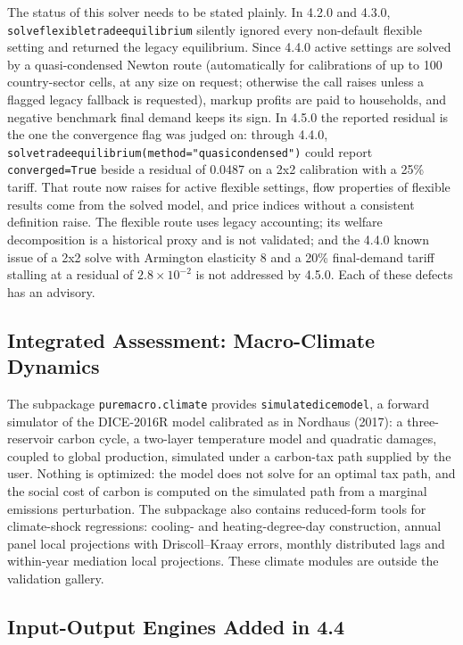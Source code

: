 \documentclass[11pt,letterpaper]{article}
\renewcommand{\_}{\pmunderscore\allowbreak}
\begin{document}
The status of this solver needs to be stated plainly. In 4.2.0 and 4.3.0, \texttt{solve\_flexible\_trade\_equilibrium} silently ignored every non-default flexible setting and returned the legacy equilibrium. Since 4.4.0 active settings are solved by a quasi-condensed Newton route (automatically for calibrations of up to 100 country-sector cells, at any size on request; otherwise the call raises unless a flagged legacy fallback is requested), markup profits are paid to households, and negative benchmark final demand keeps its sign. In 4.5.0 the reported residual is the one the convergence flag was judged on: through 4.4.0, \texttt{solve\_trade\_equilibrium(method="quasi\_condensed")} could report \texttt{converged=True} beside a residual of 0.0487 on a 2x2 calibration with a 25\% tariff. That route now raises for active flexible settings, flow properties of flexible results come from the solved model, and price indices without a consistent definition raise. The flexible route uses legacy accounting; its welfare decomposition is a historical proxy and is not validated; and the 4.4.0 known issue of a 2x2 solve with Armington elasticity 8 and a 20\% final-demand tariff stalling at a residual of \(2.8\times10^{-2}\) is not addressed by 4.5.0. Each of these defects has an advisory.

\subsection{Integrated Assessment: Macro-Climate Dynamics}\label{integrated-assessment-macro-climate-dynamics}

The subpackage \texttt{puremacro.climate} provides \texttt{simulate\_dice\_model}, a forward simulator of the DICE-2016R model calibrated as in Nordhaus (2017): a three-reservoir carbon cycle, a two-layer temperature model and quadratic damages, coupled to global production, simulated under a carbon-tax path supplied by the user. Nothing is optimized: the model does not solve for an optimal tax path, and the social cost of carbon is computed on the simulated path from a marginal emissions perturbation. The subpackage also contains reduced-form tools for climate-shock regressions: cooling- and heating-degree-day construction, annual panel local projections with Driscoll--Kraay errors, monthly distributed lags and within-year mediation local projections. These climate modules are outside the validation gallery.

\subsection{Input-Output Engines Added in 4.4}\label{input-output-engines-added-in-44}
\end{document}
